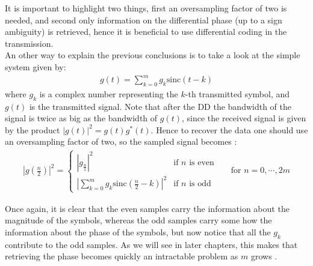 It is important to highlight two things, first an oversampling factor of two is needed, and second only information on the differential phase (up to a sign ambiguity) is retrieved, hence it is beneficial to use differential coding in the transmission.\\

An other way to explain the previous conclusions is to take a look at the simple system given by:
\begin{align*}
	g(t)=\sum_{k=0}^m g_k\text{sinc}(t-k)
\end{align*}
where $g_k$ is a complex number representing the $k$-th transmitted symbol, and $g(t)$ is the transmitted signal. Note that after the DD the bandwidth of the signal is twice as big as the bandwidth of $g(t)$, since the received signal is given by the product $|g(t)|^2=g(t)g^*(t)$. Hence to recover the data one should use an oversampling factor of two, so the sampled signal becomes \cite{Tasbihi_Tukey}:
\begin{align*}
	\left|g\left(\frac{n}{2}\right)\right|^2 = \left\{
\begin{array}{ll}
\left|g_{\frac{n}{2}}\right|^2  &  \text{if $n$ is even}  \\
\left|\sum\limits_{k=0}^m g_k\text{sinc}\left(\frac{n}{2}-k\right)\right|^2   & \text{if $n$ is odd}
\end{array}
\right. &&\text{for }n=0,\dotsb,2m
\end{align*}

Once again, it is clear that the even samples carry the information about the magnitude of the symbols, whereas the odd samples carry some how the information about the phase of the symbols, but now notice that all the $g_k$ contribute to the odd samples. As we will see in later chapters, this makes that retrieving the phase becomes quickly an intractable problem as $m$ grows \cite{Tasbihi_Tukey}. 

















